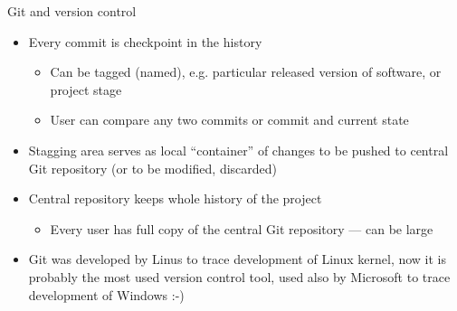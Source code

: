 \documentclass[compress, ucs, xelatex, 11pt, xcolor=svgnames, aspectratio=169,
	hyperref={
		bookmarks=true,
		unicode=true,
		colorlinks=true,
		pdftitle={Linux, command line and MetaCentrum},
		plainpages=false,
		pdfauthor={Vojtech Zeisek},
		pdfsubject={Course about use of Linux command line, writing shell scripts and using MetaCentrum of CESNET},
		pdfcreator={XeLaTeX},
		pdfkeywords={Linux, GNU, BASH, shell, command line, MetaCentrum},
		linkcolor=DarkRed, %
		anchorcolor=DarkBlue, %
		citecolor=Indigo, %
		filecolor=NavyBlue, %
		menucolor=DarkMagenta, %
		urlcolor=DarkBlue, %
		pdftex},
	url={hyphens, lowtilde} %
	]{beamer}
\begin{document}
\begin{frame}[allowframebreaks]{Git and version control}
\begin{itemize}
		\item Every commit is checkpoint in the history
		\begin{itemize}
			\item Can be tagged (named), e.g. particular released version of software, or project stage
			\item User can compare any two commits or commit and current state
		\end{itemize}
		\item Stagging area serves as local \enquote{container} of changes to be pushed to central Git repository (or to be modified, discarded)
		\item Central repository keeps whole history of the project
		\begin{itemize}
			\item Every user has full copy of the central Git repository --- can be large
		\end{itemize}
		\item Git was developed by Linus to trace development of Linux kernel, now it is probably the most used version control tool, used also by Microsoft to trace development of Windows :-)
	\end{itemize}
\end{frame}
\end{document}
